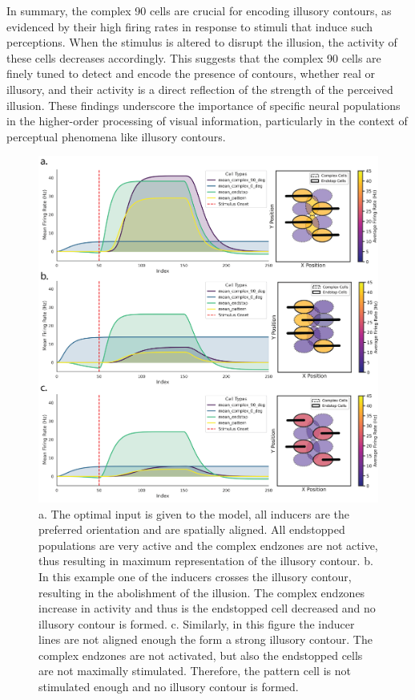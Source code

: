 \documentclass[12pt]{article}
\begin{document}
\bigbreak
In summary, the complex 90 cells are crucial for encoding illusory contours, as evidenced by their high firing rates in response to stimuli that induce such perceptions. When the stimulus is altered to disrupt the illusion, the activity of these cells decreases accordingly. This suggests that the complex 90 cells are finely tuned to detect and encode the presence of contours, whether real or illusory, and their activity is a direct reflection of the strength of the perceived illusion. These findings underscore the importance of specific neural populations in the higher-order processing of visual information, particularly in the context of perceptual phenomena like illusory contours.

\begin{figure}[H]
  \centering
  \includegraphics[width=1.0 \textwidth]{figures/Figure_Population_configs.png}
  \caption{a. The optimal input is given to the model, all inducers are the preferred orientation and are spatially aligned. All endstopped populations are very active and the complex endzones are not active, thus resulting in maximum representation of the illusory contour. b. In this example one of the inducers crosses the illusory contour, resulting in the abolishment of the illusion. The complex endzones increase in activity and thus is the endstopped cell decreased and no illusory contour is formed. c. Similarly, in this figure the inducer lines are not aligned enough the form a strong illusory contour. The complex endzones are not activated, but also the endstopped cells are not maximally stimulated. Therefore, the pattern cell is not stimulated enough and no illusory contour is formed.}
  \label{fig:population_contours}
\end{figure}
\end{document}
